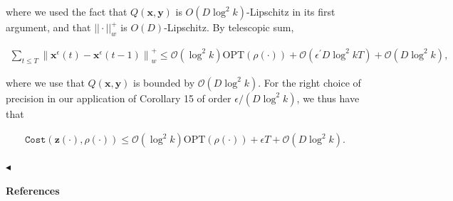 where we used the fact that $Q({\boldsymbol{x}},{\boldsymbol{y}})$ is $O(D\log^{2}k)$-Lipschitz in its first argument, and that $||\cdot||_{w}^{+}$ is $O(D)$-Lipschitz. By telescopic sum,\par


\[\begin{gathered}
\displaystyle\sum_{t\leq T}\left\|{\boldsymbol{x}}^{\epsilon}(t)-{\boldsymbol{x}}^{\epsilon}(t-1)\right\|_{w}^{+}\leq\mathcal{O}(\log^{2}k){\text{OPT}}(\rho(\cdot))+\mathcal{O}(\epsilon^{\prime}D\log^{2}kT)+\mathcal{O}(D\log^{2}k),
\end{gathered}\]


where we use that $Q({\boldsymbol{x}},{\boldsymbol{y}})$ is bounded by $\mathcal{O}(D\log^{2}k)$. For the right choice of precision in our application of Corollary 15 of order $\epsilon/(D\log^{2}k)$, we thus have that\par


\[\begin{gathered}
\displaystyle{\texttt{Cost}}({\mathbf{z}}(\cdot),\rho(\cdot))\leq\mathcal{O}(\log^{2}k){\text{OPT}}(\rho(\cdot))+\epsilon T+\mathcal{O}(D\log^{2}k).
\end{gathered}\]


$\blacktriangleleft$\par






\par\medskip\noindent\textbf{References}\par



